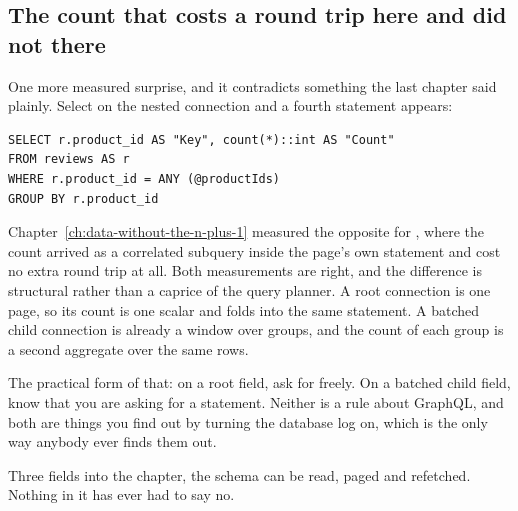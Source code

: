 \subsection*{The count that costs a round trip here and did not there}

%
One more measured surprise, and it contradicts something the last chapter said
plainly. Select  on the nested connection and a fourth
statement appears:

\begin{verbatim}
SELECT r.product_id AS "Key", count(*)::int AS "Count"
FROM reviews AS r
WHERE r.product_id = ANY (@productIds)
GROUP BY r.product_id
\end{verbatim}

Chapter~\ref{ch:data-without-the-n-plus-1} measured the opposite for
, where the count arrived as a correlated subquery inside
the page's own statement and cost no extra round trip at all. Both measurements
are right, and the difference is structural rather than a caprice of the query
planner. A root connection is one page, so its count is one scalar and folds
into the same statement. A batched child connection is already a window over
groups, and the count of each group is a second aggregate over the same rows.

The practical form of that: on a root field, ask for  freely.
On a batched child field, know that you are asking for a statement. Neither is a
rule about GraphQL, and both are things you find out by turning the database log
on, which is the only way anybody ever finds them out.

Three fields into the chapter, the schema can be read, paged and refetched.
Nothing in it has ever had to say no.
